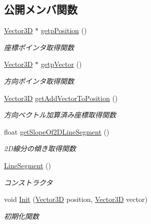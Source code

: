\subsection*{公開メンバ関数}
\begin{DoxyCompactItemize}
\item 
\mbox{\hyperlink{class_vector3_d}{Vector3D}} $\ast$ \mbox{\hyperlink{class_line_segment_ab32e8ccf6167f28f75382c94c6c7873d}{getp\+Position}} ()
\begin{DoxyCompactList}\small\item\em 座標ポインタ取得関数 \end{DoxyCompactList}\item 
\mbox{\hyperlink{class_vector3_d}{Vector3D}} $\ast$ \mbox{\hyperlink{class_line_segment_a773f1be1684f80f3f1ed6623462f76c6}{getp\+Vector}} ()
\begin{DoxyCompactList}\small\item\em 方向ポインタ取得関数 \end{DoxyCompactList}\item 
\mbox{\hyperlink{class_vector3_d}{Vector3D}} \mbox{\hyperlink{class_line_segment_af4c9249a6a1c6c75b12962ef29e6dd30}{get\+Add\+Vector\+To\+Position}} ()
\begin{DoxyCompactList}\small\item\em 方向ベクトル加算済み座標取得関数 \end{DoxyCompactList}\item 
float \mbox{\hyperlink{class_line_segment_a473738a0b67e449cf8b5a23f1146f446}{get\+Slope\+Of2\+D\+Line\+Segment}} ()
\begin{DoxyCompactList}\small\item\em 2\+D線分の傾き取得関数 \end{DoxyCompactList}\item 
\mbox{\hyperlink{class_line_segment_a4c2da2ff2d3979f28bfcb24948a8e6a9}{Line\+Segment}} ()
\begin{DoxyCompactList}\small\item\em コンストラクタ \end{DoxyCompactList}\item 
void \mbox{\hyperlink{class_line_segment_a38c6ff9ade1d084219ea9c9ae88eb5c7}{Init}} (\mbox{\hyperlink{class_vector3_d}{Vector3D}} position, \mbox{\hyperlink{class_vector3_d}{Vector3D}} vector)
\begin{DoxyCompactList}\small\item\em 初期化関数 \end{DoxyCompactList}\end{DoxyCompactItemize}
